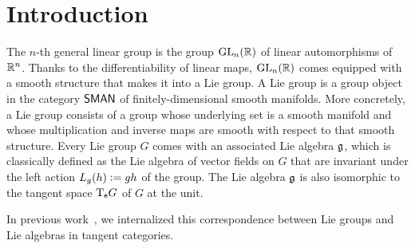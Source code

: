 \section{Introduction}
\label{section:introduction}
The $n$-th general linear group is the group $\GL_n(\Real)$ of linear automorphisms of $\Real^n$. Thanks to the differentiability of linear maps, $\GL_n(\Real)$ comes equipped with a smooth structure that makes it into a Lie group. A Lie group is a group object in the category $\SMan$ of finitely-dimensional smooth manifolds. More concretely, a Lie group consists of a group whose underlying set is a smooth manifold and whose multiplication and inverse maps are smooth with respect to that smooth structure. Every Lie group $G$ comes with an associated Lie algebra $\g$, which is classically defined as the Lie algebra of vector fields on $G$ that are invariant under the left action $L_g(h)\=gh$ of the group. The Lie algebra $\g$ is also isomorphic to the tangent space $\T_\e G$ of $G$ at the unit.

In previous work~\cite{lanfranchi:lie-correspondence-tangent-cats}, we internalized this correspondence between Lie groups and Lie algebras in tangent categories.

